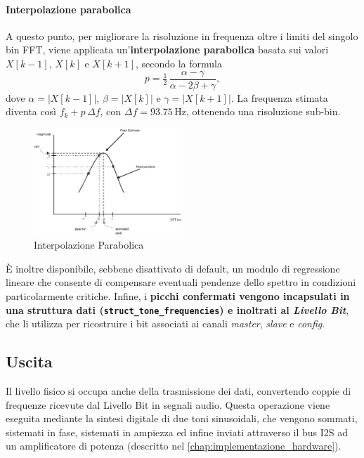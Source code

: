 \paragraph{Interpolazione parabolica}
\label{par: interpolazione_parabolica}
 A questo punto, per migliorare 
 la risoluzione in frequenza oltre i limiti del singolo bin FFT, viene applicata un’\textbf{interpolazione parabolica} basata
  sui valori $X[k-1]$, $X[k]$ e $X[k+1]$, secondo la formula
\[
p = \tfrac{1}{2}\,\frac{\alpha - \gamma}{\alpha - 2\beta + \gamma},
\]
dove $\alpha = |X[k-1]|$, $\beta = |X[k]|$ e $\gamma = |X[k+1]|$. La frequenza stimata diventa così $f_k + p\,\Delta f$, con $\Delta f = 93.75\,\text{Hz}$, 
ottenendo una risoluzione sub-bin.\\ 
\begin{figure}[H]
    \centering
    \includegraphics[width=0.5\textwidth]{immagini/parabolic_interpolation.png}
    \caption{Interpolazione Parabolica \cite{QuadraticInterpolationSpectralPeaks}}
    \label{fig:interpolazione_parabolica}
\end{figure}
È inoltre disponibile, sebbene disattivato di default, un modulo di regressione lineare che consente di compensare eventuali 
pendenze dello spettro in condizioni particolarmente critiche. Infine, i \textbf{picchi confermati vengono incapsulati in una struttura dati (\texttt{struct\_tone\_frequencies})
 e inoltrati al \emph{Livello Bit}}, che li utilizza per ricostruire i bit associati ai canali \emph{master}, \emph{slave} e \emph{config}.
\subsection{Uscita}
\label{sec:uscita_livello_fisico}
Il livello fisico si occupa anche della trasmissione dei dati, convertendo coppie di frequenze ricevute dal Livello Bit in segnali audio.
Questa operazione viene eseguita mediante la sintesi digitale di due toni sinusoidali, che vengono sommati, sistemati in fase, sistemati in ampiezza
ed infine inviati attraverso il bus I2S ad un amplificatore di potenza (descritto nel \autoref{chap:implementazione_hardware}).

